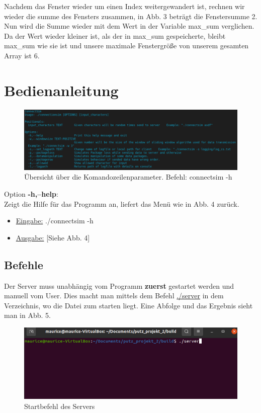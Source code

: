 \documentclass{article}
\begin{document}
Nachdem das Fenster wieder um einen Index weitergewandert ist, rechnen wir wieder die summe des Fensters zusammen, in Abb. 3 beträgt die Fenstersumme 2. Nun wird die Summe wieder mit dem Wert in
der Variable max\_sum verglichen. Da der Wert wieder kleiner ist, als der in max\_sum gespeicherte, bleibt max\_sum wie sie ist und unsere maximale Fenstergröße von unserem gesamten Array ist 6.

\section{Bedienanleitung}
\begin{center}
\begin{figure}[h]
    \centering
    \includegraphics[width=\textwidth]{connectsim-h.png}
    \caption{Übersicht über die Komandozeilenparameter. Befehl: connectsim -h}
\end{figure}
\end{center}

Option \textbf{-h,--help}:\\
Zeigt die Hilfe für das Programm an, liefert das Menü wie in Abb. 4 zurück.
\begin{itemize}
	\item \underline{Eingabe:} ./connectsim -h
	\item \underline{Ausgabe:} [Siehe Abb. 4]\\
\end{itemize}

\break

\subsection{Befehle}
Der Server muss unabhängig vom Programm \textbf{zuerst} gestartet werden und manuell vom User. Dies macht man mittels dem Befehl \underline{./server} in dem Verzeichnis, wo die Datei zum starten
liegt. Eine Abfolge und das Ergebnis sieht man in Abb. 5.

\begin{center}
\begin{figure}[h]
    \centering
    \includegraphics[width=\textwidth]{connectsimserver.png}
    \caption{Startbefehl des Servers}
\end{figure}
\end{center}
\end{document}
